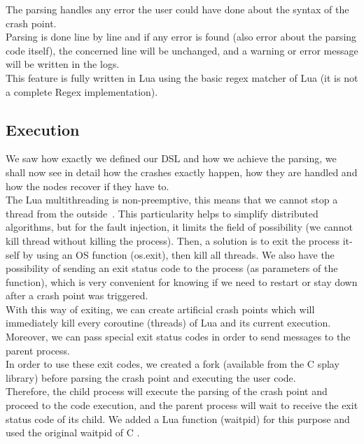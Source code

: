 \documentclass{eplmastersthesis}
\begin{document}
        The parsing handles any error the user could have done about the
        syntax of the crash point.\\
        Parsing is done line by line and if any error is found (also error
        about the parsing code itself), the concerned line will be unchanged, and
        a warning or error message will be written in the logs.\\
        This feature is fully written in Lua using the basic regex matcher of Lua
        \cite{RegexLua} (it is not a complete Regex implementation).

      \subsection{Execution}

        We saw how exactly we defined our DSL and how we achieve the parsing,
        we shall now see in detail how the crashes exactly happen, how they
        are handled and how the nodes recover if they have to.\\

        The Lua multithreading is non-preemptive, this means that we cannot stop a thread from the
        outside~\cite{CoroutineLua}. This particularity helps to simplify distributed algorithms,
        but for the fault injection, it limits the field of possibility
        (we cannot kill thread without killing the process).
        Then, a solution is to exit the process it-self by using an OS function (os.exit),
        then kill all threads. We also have the possibility of sending an exit
        status code to the process (as parameters of the function),
        which is very convenient for knowing if we need to restart or stay
        down after a crash point was triggered.\\

        With this way of exiting, we can create artificial crash points which
        will immediately kill every coroutine (threads) of Lua and its
        current execution. Moreover, we can pass special exit status codes
        in order to send messages to the parent process.\\
        In order to use these exit codes, we created a fork (available from
        the C splay library) before parsing the crash point and executing
        the user code.\\
        Therefore, the child process will execute the parsing of the crash
        point and proceed to the code execution, and the parent process will
        wait to receive the exit status code of its child. We added a Lua
        function (waitpid) for this purpose and used the original waitpid
        of C \cite{waitpid}.\\
\end{document}
